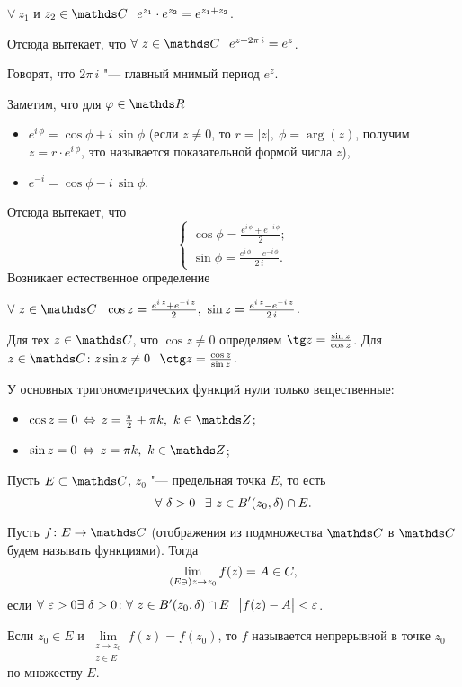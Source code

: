 \begin{Task}
	$\forall\ z_1$ и $z_2\in\C\pau e^{z_1}\cdot e^{z_2} = e^{z_1+z_2}$.
\end{Task}
Отсюда вытекает, что $\forall\ z\in \C\pau e^{z+2\pi\,i} = e^z$.
\begin{Def}
	Говорят, что $2\pi\, i$ "--- главный мнимый период $e^z$.
\end{Def}
Заметим, что для $\phi\in\R$
\begin{itemize}
	\item $e^{i\,\phi} = \cos\phi + i\, \sin\phi$ (если $z\ne0$, то $r = |z|,\ \phi = \arg(z)$, получим $z = r\cdot e^{i\,\phi}$, это называется показательной формой числа $z$),
	\item $e^{- i} = \cos\phi - i\,\sin\phi$.
\end{itemize}
Отсюда вытекает, что 
\[
	\begin{cases}
		\cos\phi = \frac{e^{i\,\phi}+e^{-i\,\phi}}2;\\
		\sin\phi = \frac{e^{i\,\phi} - e^{-i\,\phi}}{2\,i}.
	\end{cases}
\]
Возникает естественное определение
\begin{Def}
	$\forall\ z\in\C\pau
		\cos z = \frac{e^{i\, z}+e^{-i\, z}}2,\ 
		\sin z = \frac{e^{i\, z} - e^{-i\, z}}{2\,i}$.

		Для тех $z\in\C$, что $\cos z\ne 0$ определяем $\tg z = \frac{\sin z}{\cos z}$. Для $z\in \C\colon z\sin z\ne0\pau \ctg z = \frac{\cos z}{\sin z}$.
\end{Def}
\begin{Task}
	У основных тригонометрических функций нули только вещественные:
	\begin{itemize}
		\item 	$\cos z= 0\iff z = \frac\pi 2+\pi k,\ k\in\Z$;
		\item 	$\sin z= 0\iff z = \pi k,\ k\in\Z$;
	\end{itemize}
\end{Task}
Пусть $E\subset \C$, $z_0$ "--- предельная точка $E$, то есть
\[
	\forall\ \delta>0\pau\exists\ z\in B'(z_0,\delta)\cap E.
\]
\begin{Def}
	Пусть $f\colon E\to \C$ (отображения из подмножества $\C$ в $\C$ будем называть функциями). Тогда
	\[\lim\limits_{(E\ni) z\rightarrow z_0}f(z) = A\in C,\]
	если $\forall\ \varepsilon>0\exists\ \delta>0\colon \forall\ z\in B'(z_0,\delta)\cap E\hskip .75em plus.1em minus.08em\relax \big|f(z) - A\big|<\varepsilon$.
\end{Def}
\begin{Zam}
	Если $z_0\in E$ и $\lim\limits_{\substack{z\to z_0\\z\in E}}f(z) = f(z_0)$, то $f$ называется непрерывной в точке $z_0$ по множеству $E$.
\end{Zam}
